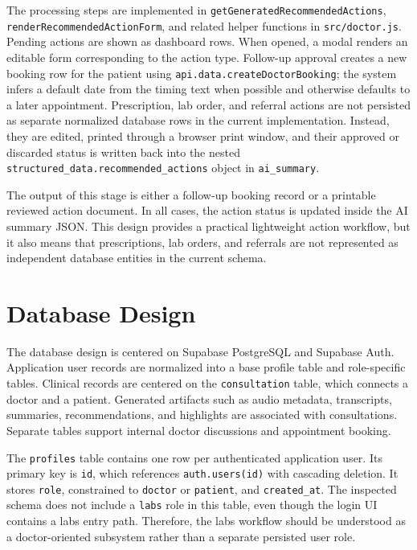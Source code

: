 The processing steps are implemented in \texttt{getGeneratedRecommendedActions}, \texttt{renderRecommendedActionForm}, and related helper functions in \texttt{src/doctor.js}. Pending actions are shown as dashboard rows. When opened, a modal renders an editable form corresponding to the action type. Follow-up approval creates a new booking row for the patient using \texttt{api.data.createDoctorBooking}; the system infers a default date from the timing text when possible and otherwise defaults to a later appointment. Prescription, lab order, and referral actions are not persisted as separate normalized database rows in the current implementation. Instead, they are edited, printed through a browser print window, and their approved or discarded status is written back into the nested \texttt{structured\_data.recommended\_actions} object in \texttt{ai\_summary}.

The output of this stage is either a follow-up booking record or a printable reviewed action document. In all cases, the action status is updated inside the AI summary JSON. This design provides a practical lightweight action workflow, but it also means that prescriptions, lab orders, and referrals are not represented as independent database entities in the current schema.

\section{Database Design}
\label{sec:database-design}

The database design is centered on Supabase PostgreSQL and Supabase Auth. Application user records are normalized into a base profile table and role-specific tables. Clinical records are centered on the \texttt{consultation} table, which connects a doctor and a patient. Generated artifacts such as audio metadata, transcripts, summaries, recommendations, and highlights are associated with consultations. Separate tables support internal doctor discussions and appointment booking.

The \texttt{profiles} table contains one row per authenticated application user. Its primary key is \texttt{id}, which references \texttt{auth.users(id)} with cascading deletion. It stores \texttt{role}, constrained to \texttt{doctor} or \texttt{patient}, and \texttt{created\_at}. The inspected schema does not include a \texttt{labs} role in this table, even though the login UI contains a labs entry path. Therefore, the labs workflow should be understood as a doctor-oriented subsystem rather than a separate persisted user role.

